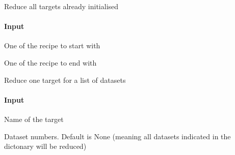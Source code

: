 \documentclass[letterpaper,10pt,english]{sphinxmanual}
\begin{document}
\begin{fulllineitems}
\begin{fulllineitems}
\label{\detokenize{api/pymusepipe:pymusepipe.target_sample.MusePipeSample.reduce_all_targets}}
\pysigstartsignatures
{}
\pysigstopsignatures
\sphinxAtStartPar
Reduce all targets already initialised


\paragraph{Input}
\label{\detokenize{api/pymusepipe:id113}}\begin{description}
\sphinxAtStartPar
One of the recipe to start with

\sphinxAtStartPar
One of the recipe to end with

\end{description}

\end{fulllineitems}


\begin{fulllineitems}
\label{\detokenize{api/pymusepipe:pymusepipe.target_sample.MusePipeSample.reduce_target}}
\pysigstartsignatures
{}
\pysigstopsignatures
\sphinxAtStartPar
Reduce one target for a list of datasets


\paragraph{Input}
\label{\detokenize{api/pymusepipe:id114}}\begin{description}
\sphinxAtStartPar
Name of the target

\sphinxAtStartPar
Dataset numbers. Default is None (meaning all datasets
indicated in the dictonary will be reduced)

\end{description}


\end{fulllineitems}
\end{fulllineitems}
\end{document}
